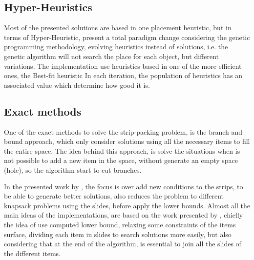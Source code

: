 \subsection{Hyper-Heuristics}

Most of the presented solutions are based in one placement heuristic,
but in terms of Hyper-Heuristic, \cite{burke2} present a total
paradigm change considering the genetic programming methodology,
evolving heuristics instead of solutions, i.e. the genetic algorithm
will not search the place for each object, but different variations.
The implementation use heuristics based in one of the more efficient
ones, the Best-fit heuristic
In each iteration, the population of heuristics has an associated
value which determine how good it is.

\subsection{Exact methods}

One of the exact methods to solve the strip-packing problem,
is the branch and bound approach,
which only consider solutions using all the necessary items
to fill the entire space.
The idea behind this approach, is solve the situations when
is not possible to add a new item in the space,
without generate an empty space (hole),
so the algorithm start to cut branches.

In the presented work by \cite{alvarez},
the focus is over add new conditions to the strips,
to be able to generate better solutions,
also reduces the problem to different knapsack problems using the slides,
before apply the lower bounds.
Almost all the main ideas of the implementations,
are based on the work presented by \cite{martello},
chiefly the idea of use computed lower bound,
relaxing some constraints of the items surface,
dividing each item in slides to search solutions
more easily, but also considering that at the end of the algorithm,
is essential to join all the slides of the different items.


% 


